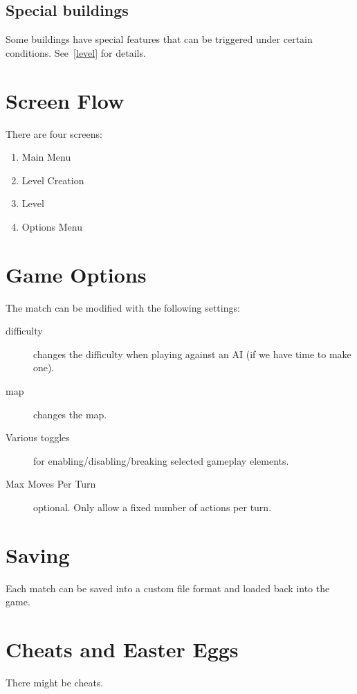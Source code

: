 \subsection{Special buildings} %
Some buildings have special features that can be triggered under certain conditions. See~\ref{level} for details.
\section{Screen Flow} %
There are four screens:

\begin{enumerate}
    \item Main Menu
    \item Level Creation
    \item Level
    \item Options Menu
\end{enumerate}
\section{Game Options} %
The match can be modified with the following settings:

\begin{description}
    \item[difficulty] changes the difficulty when playing against an AI (if we have time to make one).
    \item[map] changes the map.
    \item[Various toggles] for enabling/disabling/breaking selected gameplay elements.
    \item[Max Moves Per Turn] optional. Only allow a fixed number of actions per turn.
\end{description}
\section{Saving}
Each match can be saved into a custom file format and loaded back into the game.
\section{Cheats and Easter Eggs}
There might be cheats.
